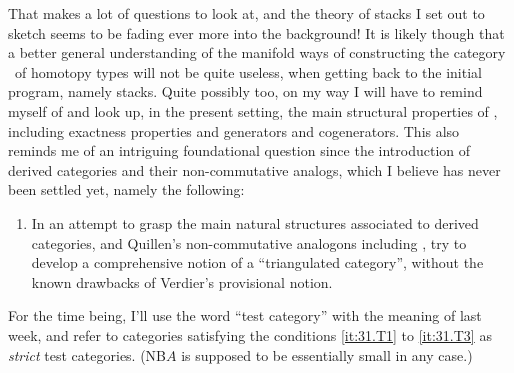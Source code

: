 That makes a lot of questions to look at, and the theory of stacks I
set out to sketch seems to be fading ever more into the background! It
is likely though that a better general understanding of the manifold
ways of constructing the category \Hot\ of homotopy types will not be
quite useless, when getting back to the initial program, namely
stacks. Quite possibly too, on my way I will have to remind myself of
and look up, in the present setting, the main structural properties of
\Hot, including exactness properties and generators and
cogenerators. This also reminds me of an intriguing foundational
question since the introduction of derived categories and their
non-commutative analogs, which I believe has never been settled yet,
namely the following:
\begin{enumerate}[label=\arabic*),resume]
\item\label{it:32.6}
  In an attempt to grasp the main natural structures associated to
  derived categories, and Quillen's non-commutative analogons
  including \Hot, try to develop a comprehensive notion of a
  ``triangulated category'', without the known drawbacks of Verdier's
  provisional notion.
\end{enumerate}

\label{sec:33}%
For the time being, I'll use the word ``test category'' with the
meaning of last week, and refer to categories satisfying the
conditions \ref{it:31.T1} to \ref{it:31.T3} as \emph{strict} test
categories. (NB\enspace $A$ is supposed to be essentially small in any
case.)


